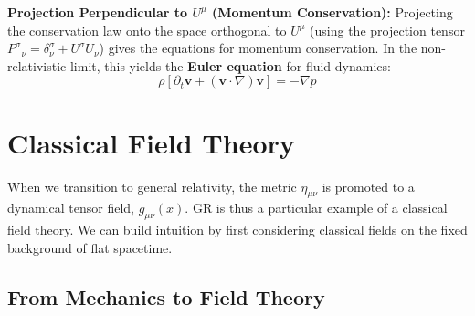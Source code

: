 \documentclass[11pt, a4paper]{report}
\begin{document}
\textbf{Projection Perpendicular to $U^\mu$ (Momentum Conservation):} Projecting the conservation law onto the space orthogonal to $U^\mu$ (using the projection tensor ${P^\sigma}_\nu = \delta^\sigma_\nu + U^\sigma U_\nu$) gives the equations for momentum conservation. In the non-relativistic limit, this yields the \textbf{Euler equation} for fluid dynamics:
\begin{equation}
    \rho[\partial_t \mathbf{v} + (\mathbf{v}\cdot\nabla)\mathbf{v}] = -\nabla p
\end{equation}
\section{Classical Field Theory}

When we transition to general relativity, the metric $\eta_{\mu\nu}$ is promoted to a dynamical tensor field, $g_{\mu\nu}(x)$. GR is thus a particular example of a classical field theory. We can build intuition by first considering classical fields on the fixed background of flat spacetime.

\subsection*{From Mechanics to Field Theory}
\end{document}
